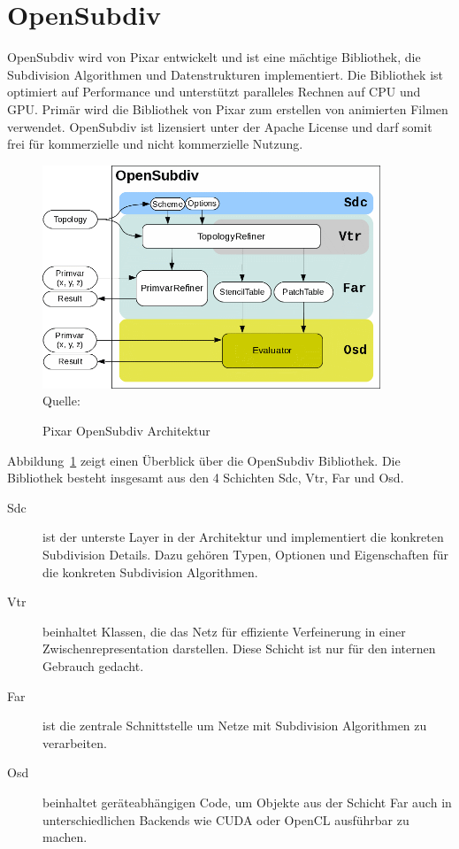 \section{OpenSubdiv}

OpenSubdiv wird von Pixar entwickelt und ist eine mächtige Bibliothek, die Subdivision Algorithmen und Datenstrukturen implementiert.
Die Bibliothek ist optimiert auf Performance und unterstützt paralleles Rechnen auf CPU und GPU.
Primär wird die Bibliothek von Pixar zum erstellen von animierten Filmen verwendet.
OpenSubdiv ist lizensiert unter der Apache License und darf somit frei für kommerzielle und nicht kommerzielle Nutzung.

\begin{figure}[h]
  \caption{Pixar OpenSubdiv Architektur}
  \centering
  \includegraphics[width=0.9\textwidth]{content/media/pixar_opensubdiv}
  \\Quelle: \cite{Pixar.27.07.2015}
  \label{fig:pixar_opensubdiv}
\end{figure}

Abbildung~\ref{fig:pixar_opensubdiv} zeigt einen Überblick über die OpenSubdiv Bibliothek.
Die Bibliothek besteht insgesamt aus den 4 Schichten \ac{Sdc}, \ac{Vtr}, \ac{Far} und \ac{Osd}.
\cite{Pixar.27.07.2015}

\begin{description}
 \item[\acs{Sdc}] ist der unterste Layer in der Architektur und implementiert die konkreten Subdivision Details.
 Dazu gehören Typen, Optionen und Eigenschaften für die konkreten Subdivision Algorithmen.
 \item[\acs{Vtr}] beinhaltet Klassen, die das Netz für effiziente Verfeinerung in einer Zwischenrepresentation darstellen.
 Diese Schicht ist nur für den internen Gebrauch gedacht.
 \item[\acs{Far}] ist die zentrale Schnittstelle um Netze mit Subdivision Algorithmen zu verarbeiten.
 \item[\acs{Osd}] beinhaltet geräteabhängigen Code, um Objekte aus der Schicht \acs{Far} auch in unterschiedlichen Backends wie
 \acs{CUDA} oder OpenCL ausführbar zu machen.
\end{description}

